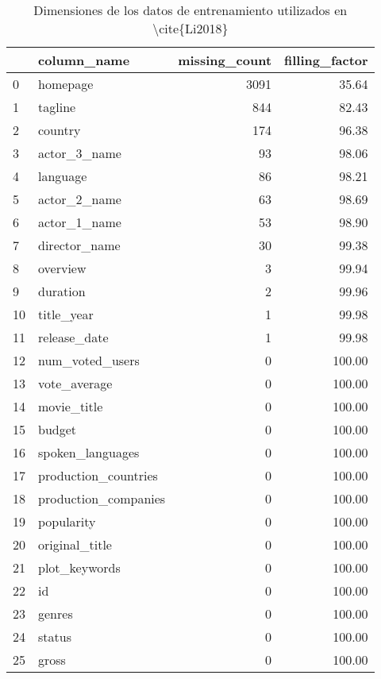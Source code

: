 \begin{table}[H]
\centering
\begin{tabular}{llrr}
\toprule
{} &           column\_name &  missing\_count &  filling\_factor \\
\midrule
0  &              homepage &           3091 &           35.64 \\
1  &               tagline &            844 &           82.43 \\
2  &               country &            174 &           96.38 \\
3  &          actor\_3\_name &             93 &           98.06 \\
4  &              language &             86 &           98.21 \\
5  &          actor\_2\_name &             63 &           98.69 \\
6  &          actor\_1\_name &             53 &           98.90 \\
7  &         director\_name &             30 &           99.38 \\
8  &              overview &              3 &           99.94 \\
9  &              duration &              2 &           99.96 \\
10 &            title\_year &              1 &           99.98 \\
11 &          release\_date &              1 &           99.98 \\
12 &       num\_voted\_users &              0 &          100.00 \\
13 &          vote\_average &              0 &          100.00 \\
14 &           movie\_title &              0 &          100.00 \\
15 &                budget &              0 &          100.00 \\
16 &      spoken\_languages &              0 &          100.00 \\
17 &  production\_countries &              0 &          100.00 \\
18 &  production\_companies &              0 &          100.00 \\
19 &            popularity &              0 &          100.00 \\
20 &        original\_title &              0 &          100.00 \\
21 &         plot\_keywords &              0 &          100.00 \\
22 &                    id &              0 &          100.00 \\
23 &                genres &              0 &          100.00 \\
24 &                status &              0 &          100.00 \\
25 &                 gross &              0 &          100.00 \\
\bottomrule
\end{tabular}
\caption{Dimensiones de los datos de entrenamiento utilizados en \textbackslash{}cite\{Li2018\}}
\label{tab:datasets}
\end{table}